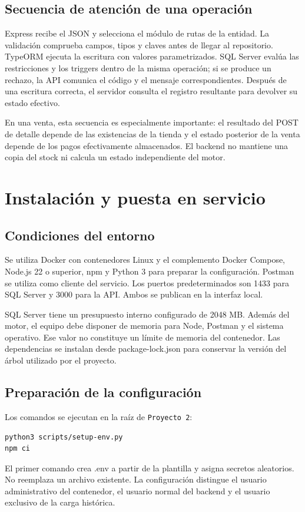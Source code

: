 \documentclass[10pt,letterpaper]{article}
\begin{document}
\subsection{Secuencia de atención de una operación}
Express recibe el JSON y selecciona el módulo de rutas de la entidad. La validación comprueba campos, tipos y claves antes de llegar al repositorio. TypeORM ejecuta la escritura con valores parametrizados. SQL Server evalúa las restricciones y los triggers dentro de la misma operación; si se produce un rechazo, la API comunica el código y el mensaje correspondientes. Después de una escritura correcta, el servidor consulta el registro resultante para devolver su estado efectivo.

En una venta, esta secuencia es especialmente importante: el resultado del POST de detalle depende de las existencias de la tienda y el estado posterior de la venta depende de los pagos efectivamente almacenados. El backend no mantiene una copia del stock ni calcula un estado independiente del motor.

\section{Instalación y puesta en servicio}
\subsection{Condiciones del entorno}
Se utiliza Docker con contenedores Linux y el complemento Docker Compose, Node.js 22 o superior, npm y Python 3 para preparar la configuración. Postman se utiliza como cliente del servicio. Los puertos predeterminados son 1433 para SQL Server y 3000 para la API. Ambos se publican en la interfaz local.

SQL Server tiene un presupuesto interno configurado de 2048 MB. Además del motor, el equipo debe disponer de memoria para Node, Postman y el sistema operativo. Ese valor no constituye un límite de memoria del contenedor. Las dependencias se instalan desde package-lock.json para conservar la versión del árbol utilizado por el proyecto.

\subsection{Preparación de la configuración}
Los comandos se ejecutan en la raíz de \texttt{Proyecto 2}:
\begin{lstlisting}
python3 scripts/setup-env.py
npm ci
\end{lstlisting}
El primer comando crea .env a partir de la plantilla y asigna secretos aleatorios. No reemplaza un archivo existente. La configuración distingue el usuario administrativo del contenedor, el usuario normal del backend y el usuario exclusivo de la carga histórica.
\end{document}
